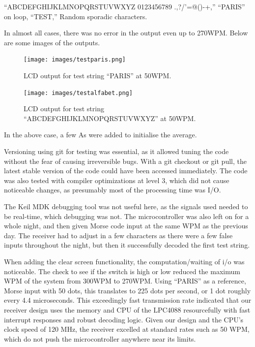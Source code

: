 \documentclass[head=13.6pt]{cce2014-design}
\begin{document}
“ABCDEFGHIJKLMNOPQRSTUVWXYZ 0123456789 .,?/'=@()-+,”
“PARIS” on loop,
“TEST,”
Random sporadic characters.

In almost all cases, there was no error in the output even up to 270WPM. Below are some images of the outputs.

\begin{figure}[h]
    \centering
    \texttt{[image: images/testparis.png]}
    \caption{LCD output for test string ``PARIS'' at 50WPM.}
    \label{testparis}
\end{figure}

\begin{figure}[h]
    \centering
    \texttt{[image: images/testalfabet.png]}
    \caption{LCD output for test string ``ABCDEFGHIJKLMNOPQRSTUVWXYZ'' at 50WPM.}
    \label{testalfabet}
\end{figure}

In the above case, a few As were added to initialise the average.



Versioning using git for testing was essential, as it allowed tuning the code without the fear of causing irreversible bugs. With a git checkout or git pull, the latest stable version of the code could have been accessed immediately. The code was also tested with compiler optimizations at level 3, which did not cause noticeable changes, as presumably most of the processing time was I/O.

The Keil MDK debugging tool was not useful here, as the signals used needed to be real-time, which debugging was not. The microcontroller was also left on for a whole night, and then given Morse code input at the same WPM as the previous day. The receiver had to adjust in a few characters as there were a few false inputs throughout the night, but then it successfully decoded the first test string.

When adding the clear screen functionality, the computation/waiting of i/o was noticeable. The check to see if the switch is high or low reduced the maximum WPM of the system from 300WPM to 270WPM. Using “PARIS” as a reference, Morse input with 50 dots, this translates to 225 dots per second, or 1 dot roughly every 4.4 microseconds. This exceedingly fast transmission rate indicated that our receiver design uses the memory and CPU of the LPC4088 resourcefully with fast interrupt responses and robust decoding logic. Given our design and the CPU’s clock speed of 120 MHz, the receiver excelled at standard rates such as 50 WPM, which do not push the microcontroller anywhere near its limits.
\end{document}

